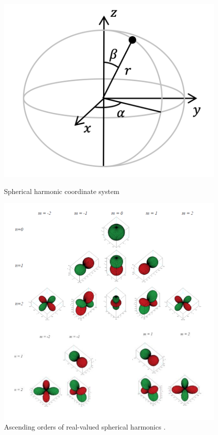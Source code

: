 \documentclass{report}
\begin{document}
        \begin{figure}[H]
            \centering
            \begin{minipage}{.4\textwidth}
                \centering
                \includegraphics[width=\linewidth]{figs/sphericalCoords.png}
                \caption{Spherical harmonic coordinate system \cite{hargreaves2020spherical}}
                \label{sphericalCoords}
            \end{minipage}
            \begin{minipage}{.59\textwidth}
                \centering
                \includegraphics[width=\linewidth]{figs/klippelSphericalHarms.png}
                \caption{Ascending orders of real-valued spherical harmonics \cite{klippel2016holographic}.}
                \label{klippelSphericalHarms}
            \end{minipage}
        \end{figure}
\end{document}
